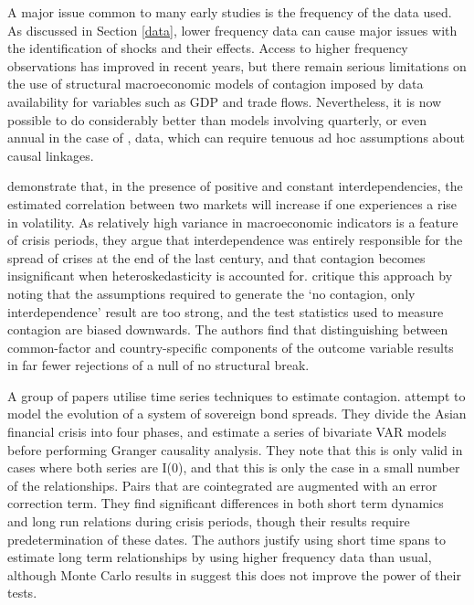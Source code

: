 \documentclass[../base.tex]{subfiles}
\begin{document}
A major issue common to many early studies is the frequency of the data used. As discussed in Section \ref{data}, lower frequency data can cause major issues with the identification of shocks and their effects. Access to higher frequency observations has improved in recent years, but there remain serious limitations on the use of structural macroeconomic models of contagion imposed by data availability for variables such as GDP and trade flows. Nevertheless, it is now possible to do considerably better than models involving quarterly, or even annual in the case of \cite{esquivel1998explaining}, data, which can require tenuous ad hoc assumptions about causal linkages.

\cite{forbes2002no} demonstrate that, in the presence of positive and constant interdependencies, the estimated correlation between two markets will increase if one experiences a rise in volatility. As relatively high variance in macroeconomic indicators is a feature of crisis periods, they argue that interdependence was entirely responsible for the spread of crises at the end of the last century, and that contagion becomes insignificant when heteroskedasticity is accounted for. \cite{corsetti2005some} critique this approach by noting that the assumptions required to generate the `no contagion, only interdependence' result are too strong, and the test statistics used to measure contagion are biased downwards. The authors find that distinguishing between common-factor and country-specific components of the outcome variable results in far fewer rejections of a null of no structural break. 

A group of papers utilise time series techniques to estimate contagion. \cite{sander2003contagion} attempt to model the evolution of a system of sovereign bond spreads. They divide the Asian financial crisis into four phases, and estimate a series of bivariate VAR models before performing Granger causality analysis. They note that this is only valid in cases where both series are I(0), and that this is only the case in a small number of the relationships. Pairs that are cointegrated are augmented with an error correction term. They find significant differences in both short term dynamics and long run relations during crisis periods, though their results require predetermination of these dates. The authors justify using short time spans to estimate long term relationships by using higher frequency data than usual, although Monte Carlo results in \cite{pierse1995temporal} suggest this does not improve the power of their tests.
\end{document}
